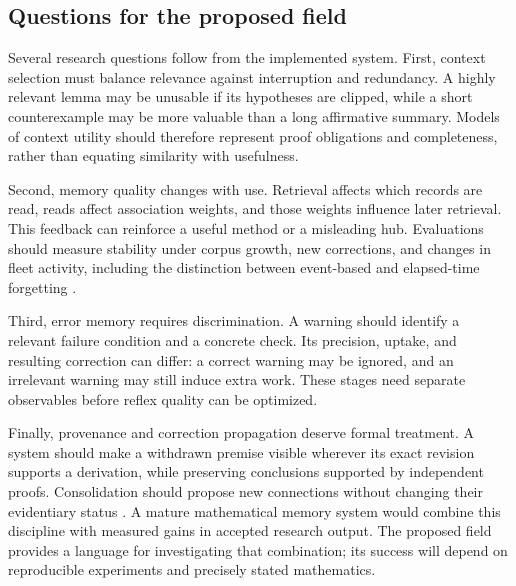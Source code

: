\subsection{Questions for the proposed field}

Several research questions follow from the implemented system. First, context selection must balance relevance against interruption and redundancy. A highly relevant lemma may be unusable if its hypotheses are clipped, while a short counterexample may be more valuable than a long affirmative summary. Models of context utility should therefore represent proof obligations and completeness, rather than equating similarity with usefulness.

Second, memory quality changes with use. Retrieval affects which records are read, reads affect association weights, and those weights influence later retrieval. This feedback can reinforce a useful method or a misleading hub. Evaluations should measure stability under corpus growth, new corrections, and changes in fleet activity, including the distinction between event-based and elapsed-time forgetting \citep{coactivation,spread,salience}.

Third, error memory requires discrimination. A warning should identify a relevant failure condition and a concrete check. Its precision, uptake, and resulting correction can differ: a correct warning may be ignored, and an irrelevant warning may still induce extra work. These stages need separate observables before reflex quality can be optimized.

Finally, provenance and correction propagation deserve formal treatment. A system should make a withdrawn premise visible wherever its exact revision supports a derivation, while preserving conclusions supported by independent proofs. Consolidation should propose new connections without changing their evidentiary status \citep{consolidation,matharchitecture}. A mature mathematical memory system would combine this discipline with measured gains in accepted research output. The proposed field provides a language for investigating that combination; its success will depend on reproducible experiments and precisely stated mathematics.

